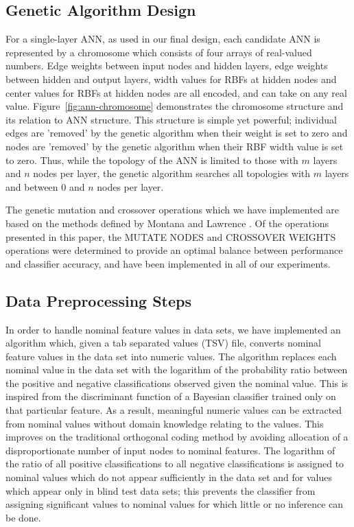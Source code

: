 \documentclass[11pt]{article}       %
\begin{document}
\subsection{Genetic Algorithm Design} \label{ann}

For a single-layer ANN, as used in our final design, each candidate ANN is represented by a chromosome which consists of four arrays of real-valued numbers. Edge weights between input nodes and hidden layers, edge weights between hidden and output layers, width values for RBFs at hidden nodes and center values for RBFs at hidden nodes are all encoded, and can take on any real value. Figure~\ref{fig:ann-chromosome} demonstrates the chromosome structure and its relation to ANN structure.  This structure is simple yet powerful; individual edges are 'removed' by the genetic algorithm when their weight is set to zero and nodes are 'removed' by the genetic algorithm when their RBF width value is set to zero.  Thus, while the topology of the ANN is limited to those with $m$ layers and $n$ nodes per layer, the genetic algorithm searches all topologies with $m$ layers and between 0 and $n$ nodes per layer.

The genetic mutation and crossover operations which we have implemented are based on the methods defined by Montana and Lawrence \cite{GA-ANN}. Of the operations presented in this paper, the MUTATE NODES and CROSSOVER WEIGHTS operations were determined to provide an optimal balance between performance and classifier accuracy, and have been implemented in all of our experiments.

\subsection{Data Preprocessing Steps} \label{preprocessing}
In order to handle nominal feature values in data sets, we have implemented an algorithm which, given a tab separated values (TSV) file, converts nominal feature values in the data set into numeric values.  The algorithm replaces each nominal value in the data set with the logarithm of the probability ratio between the positive and negative classifications observed given the nominal value.  This is inspired from the discriminant function of a Bayesian classifier trained only on that particular feature. As a result, meaningful numeric values can be extracted from nominal values without domain knowledge relating to the values. This improves on the traditional orthogonal coding method \cite[slide 17]{MLP-NominalCoding} by avoiding allocation of a disproportionate number of input nodes to nominal features.  The logarithm of the ratio of all positive classifications to all negative classifications is assigned to nominal values which do not appear sufficiently in the data set and for values which appear only in blind test data sets; this prevents the classifier from assigning significant values to nominal values for which little or no inference can be done.
\end{document}
